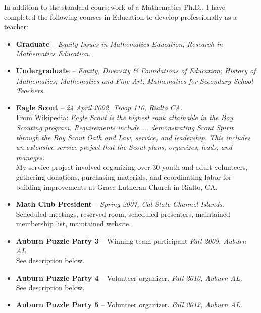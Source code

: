 \documentclass[11pt]{article}
\begin{document}
\newpage

  In addition to the standard coursework of a Mathematics Ph.D., I have
  completed the following courses in Education to develop professionally
  as a teacher:
  \begin{itemize}
    \item{}
      {\bf Graduate} -- {\em Equity Issues in Mathematics Education;
      Research in Mathematics Education.}
    \item{}
      {\bf Undergraduate} -- {\em Equity, Diversity \& Foundations of
        Education; History of Mathematics; Mathematics and Fine Art;
        Mathematics for Secondary School Teachers.}
  \end{itemize}

  \begin{itemize}
    \item{}
      {\bf Eagle Scout} --
      {\em 24 April 2002, Troop 110, Rialto CA.}\\
        From Wikipedia: {\em Eagle Scout is the highest rank attainable
        in the Boy Scouting program. Requirements include ...
        demonstrating Scout Spirit through the Boy Scout Oath and Law,
        service, and leadership. This includes an extensive service
        project that the Scout plans, organizes, leads, and manages.}\\
        My service project involved organizing over 30 youth and adult
        volunteers, gathering donations, purchasing materials, and
        coordinating labor for building improvements at Grace Lutheran
        Church in Rialto, CA.
    \item{}
      {\bf Math Club President} --
      {\em Spring 2007, Cal State Channel Islands.}\\
        Scheduled meetings, reserved room, scheduled presenters,
        maintained membership list, maintained website.
    \item{}
      {\bf Auburn Puzzle Party 3} --
      {Winning-team participant}
      {\em Fall 2009, Auburn AL.}\\
        See description below.
    \item{}
      {\bf Auburn Puzzle Party 4} --
      {Volunteer organizer.}
      {\em Fall 2010, Auburn AL.}\\
        See description below.
    \item{}
      {\bf Auburn Puzzle Party 5} --
      {Volunteer organizer.}
      {\em Fall 2012, Auburn AL.}\\

\end{itemize}
\end{document}
